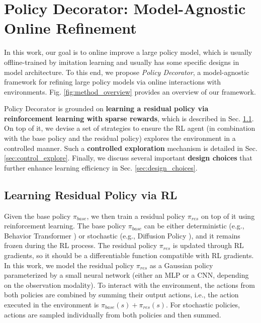 \vspace{-0.2 cm}
\section{Policy Decorator: Model-Agnostic Online Refinement}
\vspace{-0.2 cm}

In this work, our goal is to online improve a large policy model, which is usually offline-trained by imitation learning and usually has some specific designs in model architecture. To this end, we propose \textit{Policy Decorator}, a model-agnostic framework for refining large policy models via online interactions with environments. Fig. \ref{fig:method_overview} provides an overview of our framework.

Policy Decorator is grounded on \textbf{learning a residual policy via reinforcement learning with sparse rewards}, which is described in Sec. \ref{sec:residual_rl}. On top of it, we devise a set of strategies to ensure the RL agent (in combination with the base policy and the residual policy) explores the environment in a controlled manner. Such a \textbf{controlled exploration} mechanism is detailed in Sec. \ref{sec:control_explore}. Finally, we discuss several important \textbf{design choices} that further enhance learning efficiency in Sec. \ref{sec:design_choices}.



\subsection{Learning Residual Policy via RL}
\label{sec:residual_rl}

Given the base policy $\pi_{base}$, we then train a residual policy $\pi_{res}$ on top of it using reinforcement learning. The base policy $\pi_{base}$ can be either deterministic (e.g., Behavior Transformer \citep{bet}) or stochastic (e.g., Diffusion Policy \citep{dpi}), and it remains frozen during the RL process. The residual policy $\pi_{res}$ is updated through RL gradients, so it should be a differentiable function compatible with RL gradients. In this work, we model the residual policy $\pi_{res}$ as a Gaussian policy parameterized by a small neural network (either an MLP or a CNN, depending on the observation modality).
To interact with the environment, the actions from both policies are combined by summing their output actions, i.e., the action executed in the environment is $\pi_{base}(s) + \pi_{res}(s)$. For stochastic policies, actions are sampled individually from both policies and then summed.

